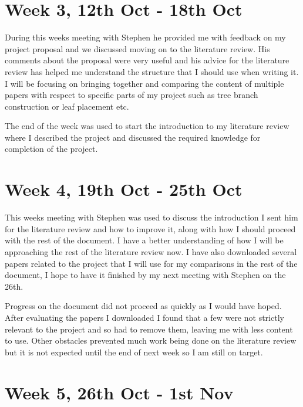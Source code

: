 \documentclass[12pt]{article}
\begin{document}
\section*{Week 3, 12th Oct - 18th Oct}
During this weeks meeting with Stephen he provided me with feedback on my project 
proposal and we discussed moving on to the literature review. His comments about the 
proposal were very useful and his advice for the literature review has helped me 
understand the structure that I should use when writing it. I will be focusing on 
bringing together and comparing the content of multiple papers with respect to specific 
parts of my project such as tree branch construction or leaf placement etc. \par
The end of the week was used to start the introduction to my literature review where 
I described the project and discussed the required knowledge for completion of the 
project.

\section*{Week 4, 19th Oct - 25th Oct}
This weeks meeting with Stephen was used to discuss the introduction I sent him for 
the literature review and how to improve it, along with how I should proceed with the 
rest of the document. I have a better understanding of how I will be approaching the 
rest of the literature review now. I have also downloaded several papers related to 
the project that I will use for my comparisons in the rest of the document, I hope to 
have it finished by my next meeting with Stephen on the 26th. \par
Progress on the document did not proceed as quickly as I would have hoped. After 
evaluating the papers I downloaded I found that a few were not strictly relevant to 
the project and so had to remove them, leaving me with less content to use. Other 
obstacles prevented much work being done on the literature review but it is not 
expected until the end of next week so I am still on target.

\section{Week 5, 26th Oct - 1st Nov}
\end{document}
